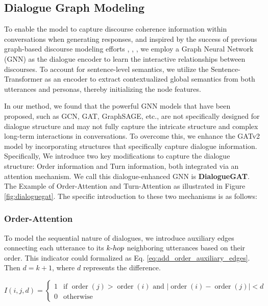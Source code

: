 
\subsection{Dialogue Graph Modeling}
To enable the model to capture discourse coherence information within conversations when generating responses, and inspired by the success of previous graph-based discourse modeling efforts \cite{dong-etal-2021-discourse}, \cite{feng-etal-2021-dialogue}, \cite{li-etal-2021-dadgraph}, we employ a Graph Neural Network (GNN) as the dialogue encoder to learn the interactive relationships between discourses. To account for sentence-level semantics, we utilize the Sentence-Transformer \cite{reimers-2019-sentence-bert} as an encoder to extract contextualized global semantics from both utterances and personas, thereby initializing the node features.

In our method, we found that the powerful GNN models that have been proposed, such as GCN, GAT, GraphSAGE, etc., are not specifically designed for dialogue structure and may not fully capture the intricate structure and complex long-term interactions in conversations. To overcome this, we enhance the GATv2 \cite{brody-etal-2022-gatv2} model by incorporating structures that specifically capture dialogue information. Specifically, We introduce two key modifications to capture the dialogue structure: Order information and Turn information, both integrated via an attention mechanism. We call this dialogue-enhanced GNN is \textbf{DialogueGAT}. The Example of Order-Attention and Turn-Attention as illustrated in Figure \ref{fig:dialoguegat}. The specific introduction to these two mechanisms is as follows:

\subsubsection{Order-Attention}
To model the sequential nature of dialogues, we introduce auxiliary edges connecting each utterance to its $k{\text -}hop$ neighboring utterances based on their order. This indicator could formalized as Eq. \ref{eq:add_order_auxiliary_edges}. Then $d=k+1$, where $d$ represents the difference.

\begin{equation}\label{eq:add_order_auxiliary_edges}
    I(i, j, d) = 
    \begin{cases} 
    1 & \text{if } \operatorname{order}(j) > \operatorname{order}(i) \text{ and } |\operatorname{order}(i) - \operatorname{order}(j)| < d \\
    0 & \text{otherwise}
    \end{cases}
\end{equation}

